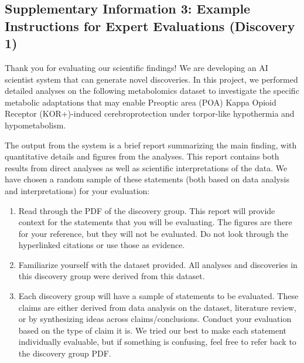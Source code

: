 \documentclass{article}
\begin{document}
\clearpage
{}

\subsection*{Supplementary Information 3: Example Instructions for Expert Evaluations (Discovery 1)}
\label{sec:supp_eval_overview}

Thank you for evaluating our scientific findings! We are developing an AI scientist system that can generate novel discoveries. In this project, we performed detailed analyses on the following metabolomics dataset to investigate the specific metabolic adaptations that may enable Preoptic area (POA) Kappa Opioid Receptor (KOR+)-induced cerebroprotection under torpor-like hypothermia and hypometabolism.

The output from the system is a brief report summarizing the main finding, with quantitative details and figures from the analyses. This report contains both results from direct analyses as well as scientific interpretations of the data. We have chosen a random sample of these statements (both based on data analysis and interpretations) for your evaluation:

\begin{enumerate}
    \item Read through the PDF of the discovery group. This report will provide context for the statements that you will be evaluating. The figures are there for your reference, but they will not be evaluated. Do not look through the hyperlinked citations or use those as evidence.
    
    \item Familiarize yourself with the dataset provided. All analyses and discoveries in this discovery group were derived from this dataset.
    
    \item Each discovery group will have a sample of statements to be evaluated. These claims are either derived from data analysis on the dataset, literature review, or by synthesizing ideas across claims/conclusions. Conduct your evaluation based on the type of claim it is. We tried our best to make each statement individually evaluable, but if something is confusing, feel free to refer back to the discovery group PDF.
\end{enumerate}
\end{document}

